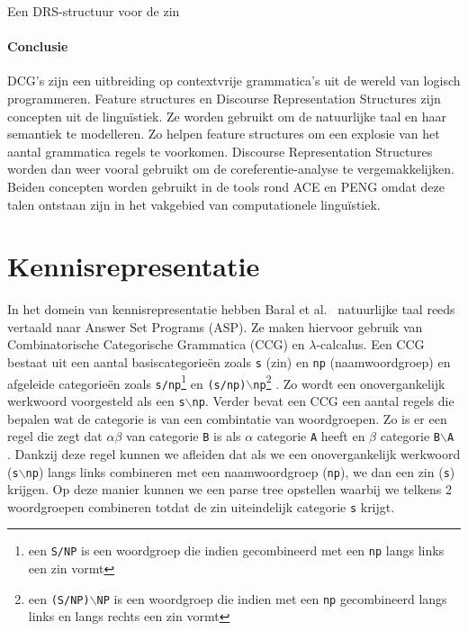 \begin{savenotes}
  \begin{drsFloat}
    \centering
    \caption{Een DRS-structuur voor de zin  \protect\footnotemark}
    \label{drs:example}
  \end{drsFloat}
\end{savenotes}


\paragraph{Conclusie} DCG's zijn een uitbreiding op contextvrije grammatica's uit de wereld van logisch programmeren. Feature structures en Discourse Representation Structures zijn concepten uit de lingu\"istiek. Ze worden gebruikt om de natuurlijke taal en haar semantiek te modelleren. Zo helpen feature structures om een explosie van het aantal grammatica regels te voorkomen. Discourse Representation Structures worden dan weer vooral gebruikt om de coreferentie-analyse te vergemakkelijken. Beiden concepten worden gebruikt in de tools rond ACE en PENG omdat deze talen ontstaan zijn in het vakgebied van computationele lingu\"istiek.

\section{Kennisrepresentatie}
\label{sec:ASP}
In het domein van kennisrepresentatie hebben Baral et al.\ \cite{Baral2008} natuurlijke taal reeds vertaald naar Answer Set Programs (ASP). Ze maken hiervoor gebruik van Combinatorische Categorische Grammatica (CCG) en $\lambda$-calcalus. Een CCG bestaat uit een aantal basiscategorie\"en zoals \texttt{s} (zin) en \texttt{np} (naamwoordgroep) en afgeleide categorie\"en zoals \texttt{s/np}\footnote{een \texttt{S/NP} is een woordgroep die indien gecombineerd met een \texttt{np} langs links een zin vormt} en \texttt{(s/np)$\backslash$np}\footnote{een \texttt{(S/NP)$\backslash$NP} is een woordgroep die indien met een \texttt{np} gecombineerd langs links en langs rechts een zin vormt} \cite{Baral2008}. Zo wordt een onovergankelijk werkwoord voorgesteld als een \texttt{s$\backslash$np}. Verder bevat een CCG een aantal regels die bepalen wat de categorie is van een combintatie van woordgroepen. Zo is er een regel die zegt dat $\alpha\beta$ van categorie \texttt{B} is als $\alpha$ categorie \texttt{A} heeft en $\beta$ categorie \texttt{B$\backslash$A} \cite{Baral2008}. Dankzij deze regel kunnen we afleiden dat als we een onovergankelijk werkwoord (\texttt{s$\backslash$np}) langs links combineren met een naamwoordgroep (\texttt{np}), we dan een zin (\texttt{s}) krijgen. Op deze manier kunnen we een parse tree opstellen waarbij we telkens 2 woordgroepen combineren totdat de zin uiteindelijk categorie \texttt{s} krijgt.

